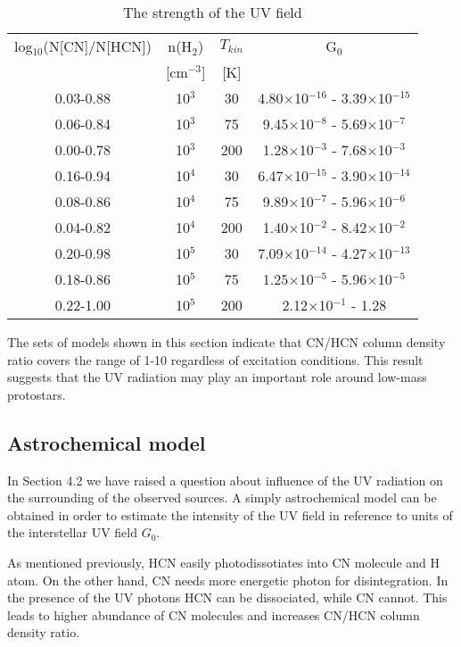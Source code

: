 \documentclass{aa}
\begin{document}
\begin{table}
\caption{The strength of the UV field}             %
\label{table:5}      %
\centering                          %
\begin{tabular}{c c c c} 
\hline\hline  
log$_{10}$(N[CN]/N[HCN]) & n(H$_2$) & $T_{kin}$ & G$_0$\\
 & [cm$^{-3}$] &  [K] & \\
\hline
0.03-0.88 & 10$^{3}$ & 30 & 4.80$\times$10$^{-16}$ - 3.39$\times$10$^{-15}$\\
0.06-0.84 & 10$^{3}$ & 75 & 9.45$\times$10$^{-8}$ - 5.69$\times$10$^{-7}$\\
0.00-0.78 & 10$^{3}$ & 200 & 1.28$\times$10$^{-3}$ - 7.68$\times$10$^{-3}$\\ 
0.16-0.94 & 10$^{4}$ & 30 & 6.47$\times$10$^{-15}$ - 3.90$\times$10$^{-14}$\\
0.08-0.86 & 10$^{4}$ & 75 & 9.89$\times$10$^{-7}$ - 5.96$\times$10$^{-6}$\\
0.04-0.82 & 10$^{4}$ & 200 & 1.40$\times$10$^{-2}$ - 8.42$\times$10$^{-2}$\\ 
0.20-0.98 & 10$^{5}$ & 30 & 7.09$\times$10$^{-14}$ - 4.27$\times$10$^{-13}$\\
0.18-0.86 & 10$^{5}$ & 75 & 1.25$\times$10$^{-5}$ - 5.96$\times$10$^{-5}$\\
0.22-1.00 & 10$^{5}$ & 200 & 2.12$\times$10$^{-1}$ - 1.28\\ \hline
\end{tabular}
\end{table} 

The sets of models shown in this section indicate that CN/HCN column density ratio covers the range of 1-10 regardless of excitation conditions. This result suggests that the UV radiation may play an important role around low-mass protostars. 

\subsection{Astrochemical model}
In Section 4.2 we have raised a question about influence of the UV radiation on the surrounding of the observed sources. A simply astrochemical model can be obtained in order to estimate the intensity of the UV field in reference to units of the interstellar UV field $G_0$.

As mentioned previously, HCN easily photodissotiates into CN molecule and H atom. On the other hand, CN needs more energetic photon for disintegration. In the presence of the UV photons HCN can be dissociated, while CN cannot. This leads to higher abundance of CN molecules and increases CN/HCN column density ratio.
\end{document}

